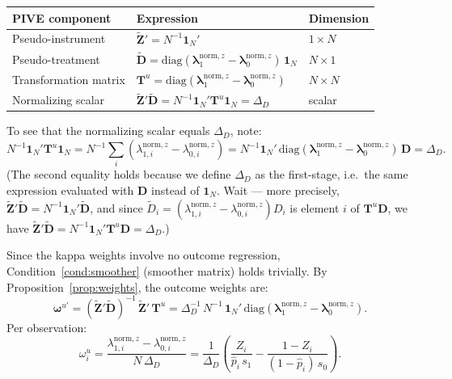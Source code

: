 \documentclass[12pt, a4paper]{article}
\theoremstyle{condstyle}
\theoremstyle{plain}
\newcommand{\bone}{\mathbf{1}_N}
\newcommand{\phat}{\hat{p}}
\begin{document}
\begin{center}
\renewcommand{\arraystretch}{1.5}
\begin{tabular}{@{}lll@{}}
\toprule
PIVE component & Expression & Dimension \\
\midrule
Pseudo-instrument & $\tilde{\mathbf{Z}}' = N^{-1}\bone'$ & $1\times N$ \\
Pseudo-treatment  & $\tilde{\mathbf{D}} = \mathrm{diag}(\boldsymbol{\lambda}_1^{\mathrm{norm},z} - \boldsymbol{\lambda}_0^{\mathrm{norm},z})\,\bone$ & $N\times 1$ \\
Transformation matrix & $\mathbf{T}^u = \mathrm{diag}(\boldsymbol{\lambda}_1^{\mathrm{norm},z} - \boldsymbol{\lambda}_0^{\mathrm{norm},z})$ & $N\times N$ \\
Normalizing scalar & $\tilde{\mathbf{Z}}'\tilde{\mathbf{D}} = N^{-1}\bone'\mathbf{T}^u\bone = \Delta_D$ & scalar \\
\bottomrule
\end{tabular}
\end{center}

\medskip\noindent
To see that the normalizing scalar equals $\Delta_D$, note:
\[
  N^{-1}\bone'\mathbf{T}^u\bone
  = N^{-1}\sum_i (\lambda_{1,i}^{\mathrm{norm},z} - \lambda_{0,i}^{\mathrm{norm},z})
  = N^{-1}\bone'\,\mathrm{diag}(\boldsymbol{\lambda}_1^{\mathrm{norm},z}-\boldsymbol{\lambda}_0^{\mathrm{norm},z})\,\mathbf{D}
  = \Delta_D.
\]
(The second equality holds because we define $\Delta_D$ as the first-stage,
i.e.\ the same expression evaluated with $\mathbf{D}$ instead of $\bone$. Wait ---
more precisely, $\tilde{\mathbf{Z}}'\tilde{\mathbf{D}} = N^{-1}\bone'\tilde{\mathbf{D}}$,
and since $\tilde{D}_i = (\lambda_{1,i}^{\mathrm{norm},z} - \lambda_{0,i}^{\mathrm{norm},z})D_i$
is element $i$ of $\mathbf{T}^u\mathbf{D}$, we have
$\tilde{\mathbf{Z}}'\tilde{\mathbf{D}} = N^{-1}\bone'\mathbf{T}^u\mathbf{D} = \Delta_D$.)

\medskip\noindent
Since the kappa weights involve no outcome regression, Condition~\ref{cond:smoother}
(smoother matrix) holds trivially. By Proposition~\ref{prop:weights}, the
outcome weights are:
\begin{equation}
  \boldsymbol{\omega}^{u\prime}
  = (\tilde{\mathbf{Z}}'\tilde{\mathbf{D}})^{-1}\,\tilde{\mathbf{Z}}'\,\mathbf{T}^u
  = \Delta_D^{-1}\,N^{-1}\,\bone'\,
    \mathrm{diag}(\boldsymbol{\lambda}_1^{\mathrm{norm},z} - \boldsymbol{\lambda}_0^{\mathrm{norm},z}).
  \label{eq:w_u_matrix}
\end{equation}
Per observation:
\begin{equation}
  \boxed{
    \omega_i^u
    = \frac{\lambda_{1,i}^{\mathrm{norm},z} - \lambda_{0,i}^{\mathrm{norm},z}}{N\,\Delta_D}
    = \frac{1}{\Delta_D}
      \left(\frac{Z_i}{\phat_i\,s_1} - \frac{1-Z_i}{(1-\phat_i)\,s_0}\right).
  }
  \label{eq:w_u_scalar}
\end{equation}
\end{document}
